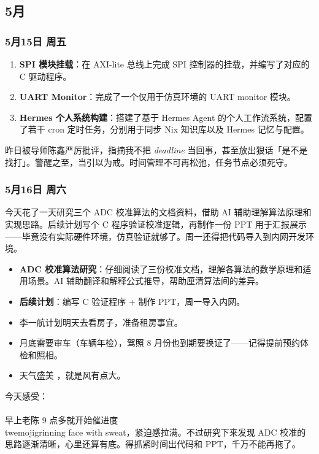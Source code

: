 \subsection{5月}

\subsubsection{5月15日 周五}

\begin{enumerate}
  \item \textbf{SPI 模块挂载}：在 AXI-lite 总线上完成 SPI 控制器的挂载，并编写了对应的 C 驱动程序。
  \item \textbf{UART Monitor}：完成了一个仅用于仿真环境的 UART monitor 模块。
  \item \textbf{Hermes 个人系统构建}：搭建了基于 Hermes Agent 的个人工作流系统，配置了若干 cron 定时任务，分别用于同步 Nix 知识库以及 Hermes 记忆与配置。
\end{enumerate}

昨日被导师陈鑫严厉批评，指摘我不把 \emph{deadline} 当回事，甚至放出狠话「是不是找打」。警醒之至，当引以为戒。时间管理不可再松弛，任务节点必须死守。


\subsubsection{5月16日 周六}

今天花了一天研究三个 ADC 校准算法的文档资料，借助 AI 辅助理解算法原理和实现思路。后续计划写个 C 程序验证校准逻辑，再制作一份 PPT 用于汇报展示——毕竟没有实际硬件环境，仿真验证就够了。周一还得把代码导入到内网开发环境。

\begin{itemize}
  \item \textbf{ADC 校准算法研究}：仔细阅读了三份校准文档，理解各算法的数学原理和适用场景。AI 辅助翻译和解释公式推导，帮助厘清算法间的差异。
  \item \textbf{后续计划}：编写 C 验证程序 + 制作 PPT，周一导入内网。
  \item 李一航计划明天去看房子，准备租房事宜。
  \item 月底需要审车（车辆年检），驾照 8 月份也到期要换证了——记得提前预约体检和照相。
  \item 天气盛美  ，就是风有点大。
\end{itemize}

今天感受：\\\\[3pt]
早上老陈 9 点多就开始催进度 \\twemoji{grinning face with sweat}，紧迫感拉满。不过研究下来发现 ADC 校准的思路逐渐清晰，心里还算有底。得抓紧时间出代码和 PPT，千万不能再拖了。

